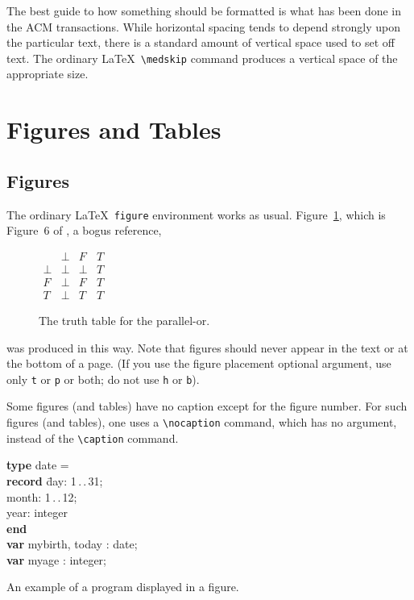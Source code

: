 \documentclass[hyperref]{acmtrans2e}
\begin{document}
The best guide to how something should be formatted is what has been
done in the ACM transactions.  While horizontal spacing tends to depend
strongly upon the particular text, there is a standard amount of
vertical space used to set off text.  The ordinary \LaTeX\ 
\verb|\medskip| command produces a vertical space of the appropriate
size.

\section{Figures and Tables}

\subsection{Figures}

The ordinary \LaTeX\ {\tt figure} environment works as usual.
Figure~\ref{fig:ordinary}, which is Figure~6 of , a bogus reference,
\begin{figure}
\centering
\(\begin{array}{c|ccc}
     & \bot & F & T \\
\hline
\bot & \bot & \bot & T \\
F    & \bot & F    & T \\
T    & \bot & T    & T
\end{array}\)
\caption{The truth table for the parallel-or.}
\label{fig:ordinary}
\end{figure}
was produced in this way.
Note that figures should never appear in the text or at the bottom of
a page. (If you use the figure placement optional argument, use only
\verb"t" or \verb"p" or both; do not use \verb"h" or \verb"b").

Some figures (and tables) have no caption except for the figure number.
For such figures (and tables), one uses a \verb|\nocaption| command,
which has no argument, instead of the \verb|\caption| command.

\begin{narrowfig}{3in}
\begin{tabbing}
{\bf type} date =\\
\hspace*{1em}\= {\bf record} \= day: 1\,.\,.\,31;\+\+\\
                                month: 1\,.\,.\,12;\\
                                year: integer \-\\
                {\bf end} \-\\
{\bf var} mybirth, today : date;\\
{\bf var} myage : integer;
\end{tabbing}
\caption{An example of a program displayed in a figure.}
\label{fig:narrow}
\end{narrowfig}
\end{document}
